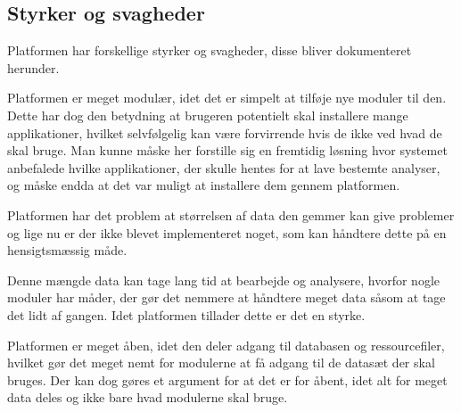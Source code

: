 \subsection{Styrker og svagheder}
Platformen har forskellige styrker og svagheder, disse bliver dokumenteret herunder. 

Platformen er meget modulær, idet det er simpelt at tilføje nye moduler til den. %
Dette har dog den betydning at brugeren potentielt skal installere mange applikationer, hvilket selvfølgelig kan være forvirrende hvis de ikke ved hvad de skal bruge. %
Man kunne måske her forstille sig en fremtidig løsning hvor systemet anbefalede hvilke applikationer, der skulle hentes for at lave bestemte analyser, og måske endda at det var muligt at installere dem gennem platformen.

Platformen har det problem at størrelsen af data den gemmer kan give problemer og lige nu er der ikke blevet implementeret noget, som kan håndtere dette på en hensigtsmæssig måde. %

Denne mængde data kan tage lang tid at bearbejde og analysere, hvorfor nogle moduler har måder, der gør det nemmere at håndtere meget data såsom at tage det lidt af gangen.
Idet platformen tillader dette er det en styrke. %

Platformen er meget åben, idet den deler adgang til databasen og ressourcefiler, hvilket gør det meget nemt for modulerne at få adgang til de datasæt der skal bruges. 
Der kan dog gøres et argument for at det er for åbent, idet alt for meget data deles og ikke bare hvad modulerne skal bruge. 

